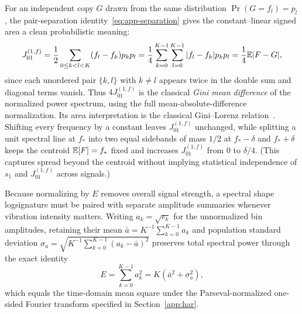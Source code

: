 For an independent copy \(G\) drawn from the same distribution \(\Pr(G = f_l) = p_l\),
the pair-separation identity~\eqref{eq:app-separation} gives the constant--linear
signed area a clean probabilistic meaning:
\begin{equation}\label{eq:spectral-separation}
 J^{(1,f)}_{01} = \frac{1}{2}\sum_{0 \leq k < l < K} (f_l - f_k) p_k p_l
                = \frac{1}{4}\sum_{k=0}^{K-1}\sum_{l=0}^{K-1} |f_l - f_k| p_k p_l
                = \frac{1}{4}\mathbb{E}|F - G|,
\end{equation}
since each unordered pair \(\{k, l\}\) with \(k \neq l\) appears twice in the
double sum and diagonal terms vanish. Thus \(4 J^{(1,f)}_{01}\) is the classical
\emph{Gini mean difference} of the normalized power spectrum, using the full
mean-absolute-difference normalization. Its area interpretation is the
classical Gini--Lorenz relation~\cite[Sec.~2]{gini}. Shifting every frequency by a
constant leaves \(J^{(1,f)}_{01}\) unchanged, while splitting a unit spectral line
at \(f_*\) into two equal sidebands of mass \(1/2\) at \(f_* - \delta\) and
\(f_* + \delta\) keeps the centroid \(\mathbb{E}[F] = f_*\) fixed and increases
\(J^{(1,f)}_{01}\) from \(0\) to \(\delta/4\). (This captures spread beyond the
centroid without implying statistical independence of \(s_1\) and \(J^{(1,f)}_{01}\)
across signals.)

Because normalizing by \(E\) removes overall signal strength, a spectral shape
logsignature must be paired with separate amplitude summaries whenever vibration
intensity matters. Writing \(a_k = \sqrt{e_k}\) for the unnormalized bin
amplitudes, retaining their mean \(\bar a = K^{-1}\sum_{k=0}^{K-1} a_k\) and
population standard deviation \(\sigma_a = \sqrt{K^{-1}\sum_{k=0}^{K-1}(a_k - \bar a)^2}\)
preserves total spectral power through the exact identity
\[
 E = \sum_{k=0}^{K-1} a_k^2 = K(\bar a^2 + \sigma_a^2),
\]
which equals the time-domain mean square under the Parseval-normalized one-sided
Fourier transform specified in Section~\ref{app:har}.
